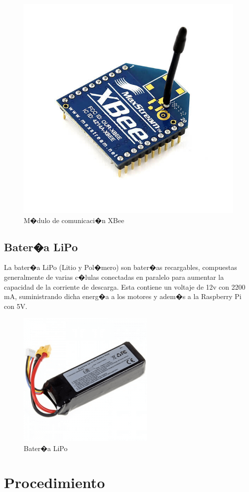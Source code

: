 		\begin{figure}[h!]
			\centering
			\includegraphics[width=0.4\linewidth, height=0.25\textheight]{Imagenes/xbee}
			\caption{M�dulo de comunicaci�n XBee}
			\label{fig:xbee}
		\end{figure}


	\subsection{Bater�a LiPo}
	
		La bater�a LiPo (Litio y Pol�mero) son bater�as recargables, compuestas generalmente de varias c�lulas conectadas en paralelo para aumentar la capacidad de la corriente de descarga. Esta contiene un voltaje de 12v con 2200 mA, suministrando dicha energ�a a los motores y adem�s a la Raspberry Pi con 5V.
		\begin{figure}[h!]
			\centering
			\includegraphics[width=0.2\linewidth, height=0.25\textheight]{Imagenes/bateria}
			\caption{Bater�a LiPo}
			\label{fig:bateria}
		\end{figure}
	


\section{Procedimiento}

